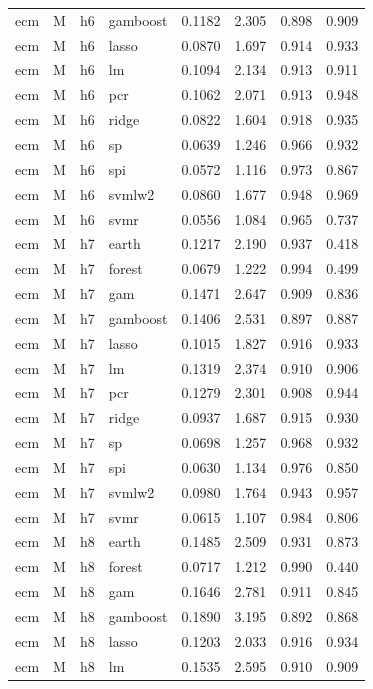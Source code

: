 \begin{ThreePartTable}
\begin{longtable}[t]{llclcccc}
ecm & M & h6 & gamboost & 0.1182 & 2.305 & 0.898 & 0.909\\
ecm & M & h6 & lasso & 0.0870 & 1.697 & 0.914 & 0.933\\
ecm & M & h6 & lm & 0.1094 & 2.134 & 0.913 & 0.911\\
ecm & M & h6 & pcr & 0.1062 & 2.071 & 0.913 & 0.948\\
ecm & M & h6 & ridge & 0.0822 & 1.604 & 0.918 & 0.935\\
ecm & M & h6 & sp & 0.0639 & 1.246 & 0.966 & 0.932\\
ecm & M & h6 & spi & 0.0572 & 1.116 & 0.973 & 0.867\\
ecm & M & h6 & svmlw2 & 0.0860 & 1.677 & 0.948 & 0.969\\
ecm & M & h6 & svmr & 0.0556 & 1.084 & 0.965 & 0.737\\
\addlinespace
ecm & M & h7 & earth & 0.1217 & 2.190 & 0.937 & 0.418\\
ecm & M & h7 & forest & 0.0679 & 1.222 & 0.994 & 0.499\\
ecm & M & h7 & gam & 0.1471 & 2.647 & 0.909 & 0.836\\
ecm & M & h7 & gamboost & 0.1406 & 2.531 & 0.897 & 0.887\\
ecm & M & h7 & lasso & 0.1015 & 1.827 & 0.916 & 0.933\\
ecm & M & h7 & lm & 0.1319 & 2.374 & 0.910 & 0.906\\
ecm & M & h7 & pcr & 0.1279 & 2.301 & 0.908 & 0.944\\
ecm & M & h7 & ridge & 0.0937 & 1.687 & 0.915 & 0.930\\
ecm & M & h7 & sp & 0.0698 & 1.257 & 0.968 & 0.932\\
ecm & M & h7 & spi & 0.0630 & 1.134 & 0.976 & 0.850\\
ecm & M & h7 & svmlw2 & 0.0980 & 1.764 & 0.943 & 0.957\\
ecm & M & h7 & svmr & 0.0615 & 1.107 & 0.984 & 0.806\\
\addlinespace
ecm & M & h8 & earth & 0.1485 & 2.509 & 0.931 & 0.873\\
ecm & M & h8 & forest & 0.0717 & 1.212 & 0.990 & 0.440\\
ecm & M & h8 & gam & 0.1646 & 2.781 & 0.911 & 0.845\\
ecm & M & h8 & gamboost & 0.1890 & 3.195 & 0.892 & 0.868\\
ecm & M & h8 & lasso & 0.1203 & 2.033 & 0.916 & 0.934\\
ecm & M & h8 & lm & 0.1535 & 2.595 & 0.910 & 0.909\\

\end{longtable}
\end{ThreePartTable}
